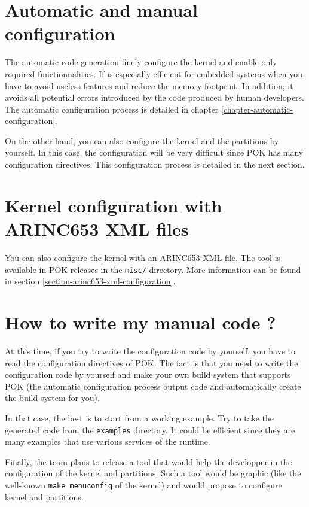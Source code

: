    \section{Automatic and manual configuration}
   The automatic code generation finely configure the kernel and enable only
   required functionnalities. If is especially efficient for embedded systems
   when you have to avoid useless features and reduce the memory footprint.
   In addition, it avoids all potential errors introduced by the code produced
   by human developers. The automatic configuration process is detailed in
   chapter \ref{chapter-automatic-configuration}.

   On the other hand, you can also configure the kernel and the partitions by
   yourself. In this case, the configuration will be very difficult since POK
   has many configuration directives. This configuration process is detailed in
   the next section.

   \section{Kernel configuration with ARINC653 XML files}
   You can also configure the kernel with an ARINC653 XML file. The tool is
   available in POK releases in the \texttt{misc/} directory. More information
   can be found in section \ref{section-arinc653-xml-configuration}.

   \section{How to write my manual code ?}
   At this time, if you try to write the configuration code by yourself, you
   have to read the configuration directives of POK. The fact is that you need
   to write the configuration code by yourself and make your own build system
   that supports POK (the automatic configuration process output code and
   automatically create the build system for you).

   In that case, the best is to start from a working example. Try to take the
   generated code from the \texttt{examples} directory. It could be efficient
   since they are many examples that use various services of the runtime.

   Finally, the \pok team plans to release a tool that would help the developper
   in the configuration of the kernel and partitions. Such a tool would be
   graphic (like the well-known \texttt{make menuconfig} of the \linux kernel)
   and would propose to configure kernel and partitions.

